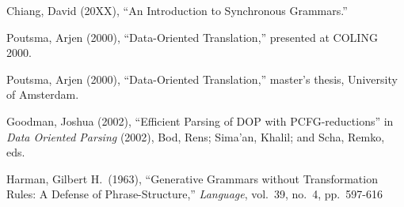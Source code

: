 \documentclass[a4paper]{article}
\theoremstyle{definition}
\begin{document}
\begin{thebibliography}{BlAbLa00}

 Chiang, David (20XX), ``An Introduction to Synchronous Grammars.''

 Poutsma, Arjen (2000), ``Data-Oriented Translation,'' presented at
	COLING 2000.

 Poutsma, Arjen (2000), ``Data-Oriented Translation,'' master's
	thesis, University of Amsterdam.

 Goodman, Joshua (2002), ``Efficient Parsing of DOP with
	PCFG-reductions'' in \emph{Data Oriented Parsing} (2002), Bod, Rens;
	Sima'an, Khalil; and Scha, Remko, eds.

 Harman, Gilbert H.\ (1963), ``Generative Grammars without
	Transformation Rules: A Defense of Phrase-Structure,'' \emph{Language},
	vol.\ 39, no.\ 4, pp.\ 597-616



\end{thebibliography}
\end{document}
